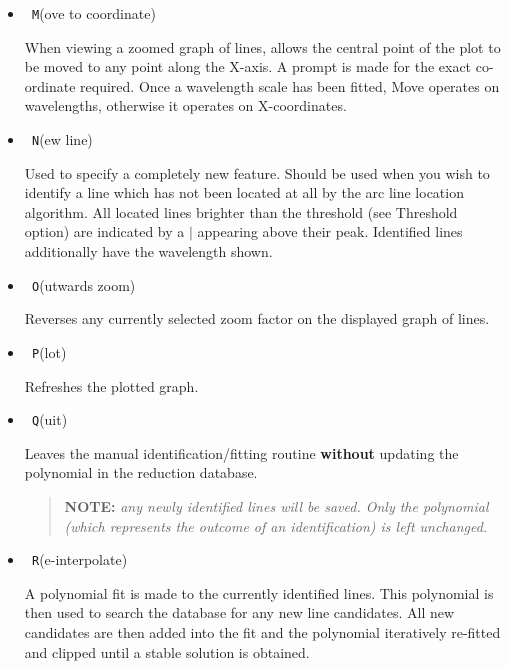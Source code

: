 \documentclass[twoside,11pt]{article}
\renewcommand{\_}{\texttt{\symbol{95}}}
\newcommand{\sunspec}[2]{#1}
\newcommand{\myindex}[1]{\index{#1}}
\newcommand{\sunspec}[2]{#2}
\newcommand{\myindex}[1]{}
\begin{document}
\begin{itemize}
\begin{itemize}
      \item {\sunspec{\Large\tt}{\bf} M}(ove to coordinate)

            When viewing a zoomed graph
            of lines, allows the central point of the plot to be moved to
            any point along the X-axis. A prompt is made for the exact
            co-ordinate required. Once a wavelength scale has been fitted,
            Move operates on wavelengths, otherwise it operates on
            X-coordinates.

      \item {\sunspec{\Large\tt}{\bf} N}(ew line)
            \myindex{Arc fitting!new line}

            Used to specify a completely new
            feature. Should be used when you wish to identify a line which
            has not been located at all by the arc line location algorithm.
            All located lines brighter than the threshold (see Threshold
            option) are indicated by a \(\mid\) appearing above their peak.
            Identified lines additionally have the wavelength shown.

      \item {\sunspec{\Large\tt}{\bf} O}(utwards zoom)

            Reverses any currently selected
            zoom factor on the displayed graph of lines.

      \item {\sunspec{\Large\tt}{\bf} P}(lot)

            Refreshes the plotted graph.

      \item {\sunspec{\Large\tt}{\bf} Q}(uit)

            Leaves the manual identification/fitting
            routine {\bf without} updating the polynomial in the reduction
            database.

            \begin{quote}

               {\bf NOTE:} {\sl any newly identified lines will be saved.
               Only the polynomial (which represents the outcome of an
               identification) is left unchanged.}

            \end{quote}

      \item {\sunspec{\Large\tt}{\bf} R}(e-interpolate)

            A polynomial fit is made to the
            currently identified lines. This polynomial is then used to
            search the database for any new line candidates. All new
            candidates are then added into the fit and the polynomial
            iteratively re-fitted and clipped until a stable solution is
            obtained.


\end{itemize}
\end{itemize}
\end{document}
